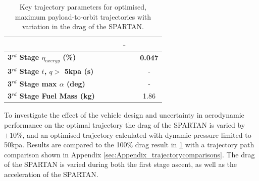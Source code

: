 \begin{table}[ht!]
\begin{tabular}{l c c c c c c}
		& \secondFlightTimeCdStandardNoReturn
		& \secondFlightTimeCdOneHundredFiveNoReturn
		& \secondFlightTimeCdOneHundredTenNoReturn
		& -
		\\
		\hline 
		\textbf{3$^{rd}$ Stage $\eta_{exergy}$ (\%)}
		& \textbf{\thirddExergyEffCdNinetyNoReturn}
		& \textbf{\thirddExergyEffCdNinetyFiveNoReturn}
		& \textbf{\thirddExergyEffCdStandardNoReturn}
		& \textbf{\thirddExergyEffCdOneHundredFiveNoReturn}
		& \textbf{\thirddExergyEffCdOneHundredTenNoReturn}
		& \textbf{0.047}
		\\
		\textbf{3$^{rd}$ Stage $t$, $q >$ 5kpa (s)}
		& \thirdqOverFiveCdNinetyNoReturn
		& \thirdqOverFiveCdNinetyFiveNoReturn
		& \thirdqOverFiveCdStandardNoReturn
		& \thirdqOverFiveCdOneHundredFiveNoReturn
		& \thirdqOverFiveCdOneHundredTenNoReturn
		& -
		\\
		\textbf{3$^{rd}$ Stage max $\alpha$ (deg)}
		& \thirdmaxAoACdNinetyNoReturn
		& \thirdmaxAoACdNinetyFiveNoReturn
		& \thirdmaxAoACdStandardNoReturn
		& \thirdmaxAoACdOneHundredFiveNoReturn
		& \thirdmaxAoACdOneHundredTenNoReturn
		& -
		\\
		\textbf{3$^{rd}$ Stage Fuel Mass (kg)}
		& \thirdmFuelCdNinetyNoReturn
		& \thirdmFuelCdNinetyFiveNoReturn
		& \thirdmFuelCdStandardNoReturn
		& \thirdmFuelCdOneHundredFiveNoReturn
		& \thirdmFuelCdOneHundredTenNoReturn
		&1.86
		\\
		\hline 
	\end{tabular} 
	\caption{Key trajectory parameters for optimised, maximum payload-to-orbit trajectories with variation in the drag of the SPARTAN.}
	\label{tab:DragVariationNoReturn}
\end{table}

To investigate the effect of the vehicle design and uncertainty in aerodynamic performance on the optimal trajectory the drag of the SPARTAN is varied by $\pm10$\%, and an optimised trajectory calculated with dynamic pressure limited to 50kpa. Results are compared to the 100\% drag result in \ref{tab:DragVariationNoReturn} with a trajectory path comparison shown in Appendix \ref{sec:Appendix_trajectorycomparisons}. The drag of the SPARTAN is varied during both the first stage ascent, as well as the acceleration of the SPARTAN. 

